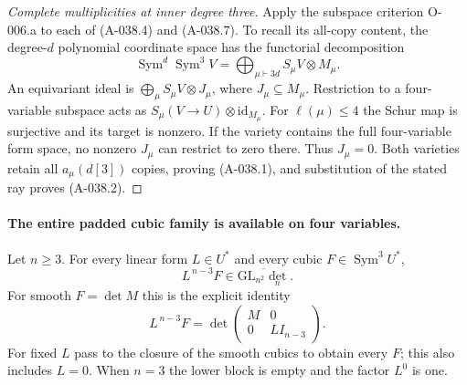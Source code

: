 \begin{proof}[Complete multiplicities at inner degree three]
Apply the subspace criterion O-006.a to each of
(A-038.4) and (A-038.7). To recall its all-copy content,
the degree-\(d\) polynomial coordinate space has the
functorial decomposition
\[
 \operatorname{Sym}^d\operatorname{Sym}^3V
      =\bigoplus_{\mu\vdash3d}S_\mu V\otimes M_\mu.
\]
An equivariant ideal is
\(\bigoplus_\mu S_\mu V\otimes J_\mu\), where
\(J_\mu\subseteq M_\mu\).
Restriction to a four-variable subspace acts as
\(S_\mu(V\to U)\otimes\mathrm{id}_{M_\mu}\).
For \(\ell(\mu)\leq4\) the Schur map is surjective and
its target is nonzero. If the variety contains the full
four-variable form space, no nonzero \(J_\mu\) can
restrict to zero there. Thus \(J_\mu=0\).
Both varieties retain all \(a_\mu(d[3])\) copies, proving
(A-038.1), and substitution of the stated ray proves
(A-038.2).
\end{proof}

\paragraph{The entire padded cubic family is available on four variables.}
Let \(n\geq3\). For every linear form \(L\in U^*\) and
every cubic \(F\in\operatorname{Sym}^3U^*\),
\[
                      L^{\,n-3}F\in
                            \overline{\mathrm{GL}_{n^2}\det_n}.
                                                               \tag{A-038.8}
\]
For smooth \(F=\det M\) this is the explicit identity
\[
        L^{\,n-3}F
           =\det\begin{pmatrix}
                        M&0\\0&L I_{n-3}
                 \end{pmatrix}.                              \tag{A-038.9}
\]
For fixed \(L\) pass to the closure of the smooth cubics
to obtain every \(F\); this also includes \(L=0\).
When \(n=3\) the lower block is empty and the factor
\(L^0\) is one.

